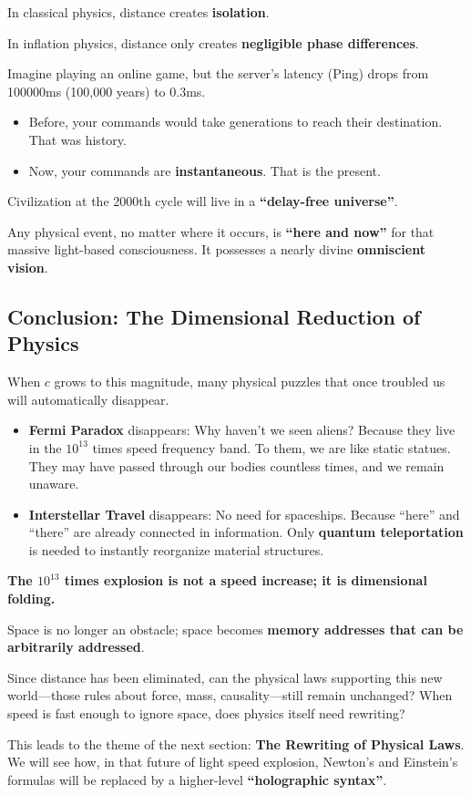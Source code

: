 In classical physics, distance creates \textbf{isolation}.

In inflation physics, distance only creates \textbf{negligible phase differences}.

Imagine playing an online game, but the server's latency (Ping) drops from 100000ms (100,000 years) to 0.3ms.

\begin{itemize}
\item Before, your commands would take generations to reach their destination. That was history.

\item Now, your commands are \textbf{instantaneous}. That is the present.
\end{itemize}

Civilization at the 2000th cycle will live in a \textbf{``delay-free universe''}.

Any physical event, no matter where it occurs, is \textbf{``here and now''} for that massive light-based consciousness. It possesses a nearly divine \textbf{omniscient vision}.

\subsection{Conclusion: The Dimensional Reduction of Physics}

When $c$ grows to this magnitude, many physical puzzles that once troubled us will automatically disappear.

\begin{itemize}
\item \textbf{Fermi Paradox} disappears: Why haven't we seen aliens? Because they live in the $10^{13}$ times speed frequency band. To them, we are like static statues. They may have passed through our bodies countless times, and we remain unaware.

\item \textbf{Interstellar Travel} disappears: No need for spaceships. Because ``here'' and ``there'' are already connected in information. Only \textbf{quantum teleportation} is needed to instantly reorganize material structures.
\end{itemize}

\textbf{The $10^{13}$ times explosion is not a speed increase; it is dimensional folding.}

Space is no longer an obstacle; space becomes \textbf{memory addresses that can be arbitrarily addressed}.

Since distance has been eliminated, can the physical laws supporting this new world---those rules about force, mass, causality---still remain unchanged? When speed is fast enough to ignore space, does physics itself need rewriting?

This leads to the theme of the next section: \textbf{The Rewriting of Physical Laws}. We will see how, in that future of light speed explosion, Newton's and Einstein's formulas will be replaced by a higher-level \textbf{``holographic syntax''}.

